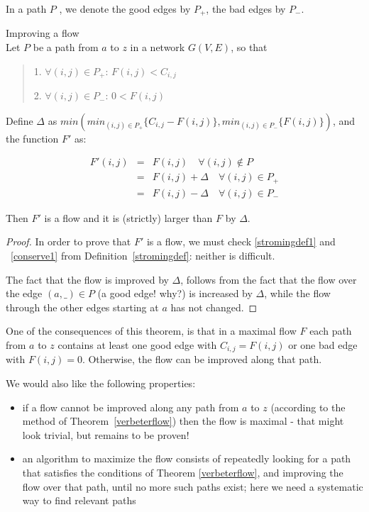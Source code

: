 In a path $P$ , we denote the good edges by $P_{+}$, the bad edges by $P_{-}$.


 \begin{theorem} Improving a flow
\label{verbeterflow}\\
Let $P$ be a path from $a$ to $z$ in a network $G(V,E)$, so that
\begin{verse}
1.
$\forall (i,j) \in P_{+}$: $F(i,j) < C_{i,j}$

2.
$\forall (i,j) \in P_{-}$: $0 < F(i,j)$
\end{verse}

Define $\Delta$ as $min(min_{(i,j) \in P_{+}}
\{C_{i,j}-F(i,j)\},min_{(i,j) \in P_{-}} \{F(i,j)\})$, and the
function $F'$ as:

\begin{eqnarray*}
F'(i,j) & = & F(i,j) \quad \forall (i,j) \notin P\\
        & = & F(i,j) + \Delta \quad \forall (i,j) \in P_{+}\\
        & = & F(i,j) - \Delta \quad \forall (i,j) \in P_{-}
\end{eqnarray*}

Then $F'$ is a flow and it is (strictly) larger than $F$ by $\Delta$.

\end{theorem}
\begin{proof} In order to prove that $F'$ is a flow, we must check
\ref{stromingdef1} and ~\ref{conserve1} from
Definition~\ref{stromingdef}: neither is difficult.

The fact that the flow is improved by $\Delta$, follows from the fact
that the flow over the edge $(a,\_) \in P$ (a good edge! why?) is
increased by $\Delta$, while the flow through the other edges starting
at $a$ has not changed. \end{proof}

One of the consequences of this theorem, is that in a maximal flow $F$
each path from $a$ to $z$ contains at least one good edge with
$C_{i,j} = F(i,j)$ or one bad edge with $F(i,j) = 0$. Otherwise, the
flow can be improved along that path.

We would also like the following properties:

\begin{itemize}
\item
if a flow cannot be improved along any path from $a$ to $z$ (according
to the method of Theorem~\ref{verbeterflow}) then the flow is maximal
- that might look trivial, but remains to be proven!
\item
an algorithm to maximize the flow consists of repeatedly looking for a
path that satisfies the conditions of Theorem \ref{verbeterflow},
and improving the flow over that path, until no more such paths exist;
here we need a systematic way to find relevant paths
\end{itemize}


